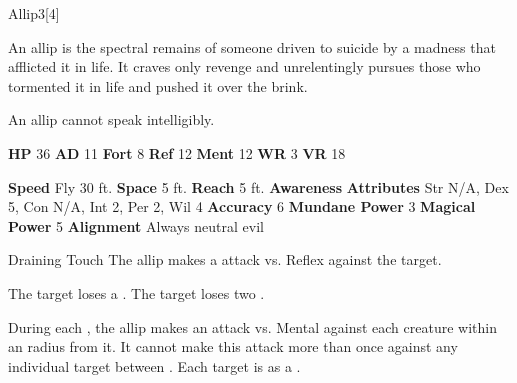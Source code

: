       
  \begin{monsection}{Allip}{3}[4]
    \vspace{-1em}\vspace{-1em}
    \vspace{0em}

    
      An allip is the spectral remains of someone driven to suicide by a madness that afflicted it in life.
      It craves only revenge and unrelentingly pursues those who tormented it in life and pushed it over the brink.

      An allip cannot speak intelligibly.
    
    

    \begin{spellcontent}
      \begin{spelltargetinginfo}
        \pari \textbf{HP} 36 \monsep
          \textbf{AD} 11 \monsep
          \textbf{Fort} 8 \monsep
          \textbf{Ref} 12 \monsep
          \textbf{Ment} 12
        \pari \textbf{WR} 3 \monsep
        \textbf{VR} 18
        
      \end{spelltargetinginfo}
    \end{spellcontent}
    \begin{monsterfooter}
      \pari \textbf{Speed} Fly 30 ft. \monsep
        \textbf{Space} 5 ft. \monsep
        \textbf{Reach} 5 ft.
      \pari \textbf{Awareness} 
      \pari \textbf{Attributes}
        Str N/A, Dex 5,
        Con N/A, Int 2,
        Per 2, Wil 4
      \pari \textbf{Accuracy} 6 \monsep
        \textbf{Mundane Power} 3 \monsep
      \textbf{Magical Power} 5
      \pari \textbf{Alignment} Always neutral evil
    \end{monsterfooter}
  \end{monsection}
  \begin{freeability}{Draining Touch}
       The allip makes a  attack
        vs. Reflex against the target.
    
    \hit The target loses a .
    \crit The target loses two .
    \end{freeability}
  
          During each , the allip makes an attack vs. Mental against each creature
          within an \arealarge radius  from it.
          It cannot make this attack more than once against any individual target between .
          \hit Each target is  as a .
        
